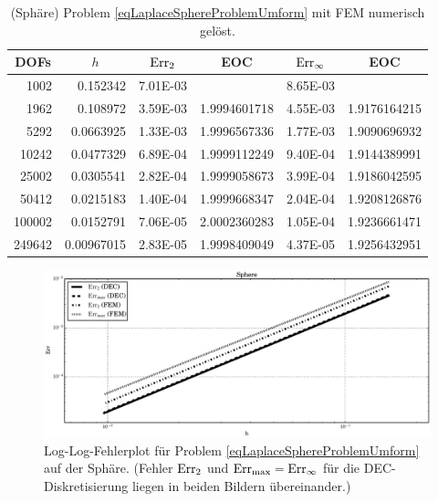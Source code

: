 \begin{beispiel}[Einheitssphäre]
       \begin{table}[htbp]
       \centering
       \begin{tabular}{|r|r|r|r|r|r|}
       \hline
       \multicolumn{1}{|c|}{DOFs} & \multicolumn{1}{c|}{\( h \)} & \multicolumn{1}{c|}{\( \text{Err}_{2} \)} & \multicolumn{1}{c|}{EOC} &
       \multicolumn{1}{c|}{ \( \text{Err}_{\infty} \)} & \multicolumn{1}{c|}{EOC} \\ \hline
        1002 & 0.152342 & 7.01E-03 & \multicolumn{1}{l|}{} & 8.65E-03 & \multicolumn{1}{l|}{} \\ \hline
        1962 & 0.108972 & 3.59E-03 & 1.9994601718 & 4.55E-03 & 1.9176164215 \\ \hline
        5292 & 0.0663925 & 1.33E-03 & 1.9996567336 & 1.77E-03 & 1.9090696932 \\ \hline
        10242 & 0.0477329 & 6.89E-04 & 1.9999112249 & 9.40E-04 & 1.9144389991 \\ \hline
        25002 & 0.0305541 & 2.82E-04 & 1.9999058673 & 3.99E-04 & 1.9186042595 \\ \hline
        50412 & 0.0215183 & 1.40E-04 & 1.9999668347 & 2.04E-04 & 1.9208126876 \\ \hline
        100002 & 0.0152791 & 7.06E-05 & 2.0002360283 & 1.05E-04 & 1.9236661471 \\ \hline
        249642 & 0.00967015 & 2.83E-05 & 1.9998409049 & 4.37E-05 & 1.9256432951 \\ \hline
       \end{tabular}
       \caption[Laplace auf Sphäre (FEM)]{(Sphäre) Problem \eqref{eqLaplaceSphereProblemUmform} mit FEM numerisch gelöst.}
       \label{tabLaplaceSphereFEM}
       \end{table}
      \begin{figure}
        \centering\includegraphics[width=\textwidth]{bilder/laplaceSphere/errplot.eps}
        \caption[Fehlerplot (Laplace auf Sphäre/Torus)]
                {Log-Log-Fehlerplot für Problem \eqref{eqLaplaceSphereProblemUmform} auf der Sphäre.
                 (Fehler \( \text{Err}_{2} \) und \( \text{Err}_{\max}=\text{Err}_{\infty} \) für die DEC-Diskretisierung liegen 
                  in beiden Bildern übereinander.)}
        \label{figFehlerPlotLaplaceSphere}
      \end{figure}
    \end{beispiel}


